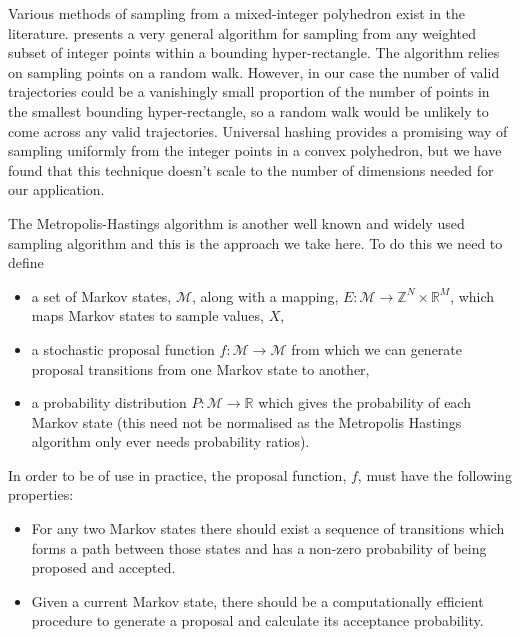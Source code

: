 \documentclass{article}
\begin{document}
Various methods of sampling from a mixed-integer polyhedron exist in the literature. \citet{baumert2009discrete} presents a very general algorithm for sampling from any weighted subset of integer points within a bounding hyper-rectangle. The algorithm relies on sampling points on a random walk. However, in our case the number of valid trajectories could be a vanishingly small proportion of the number of points in the smallest bounding hyper-rectangle, so a random walk would be unlikely to come across any valid trajectories. Universal hashing \citep{meel2016constrained} provides a promising way of sampling uniformly from the integer points in a convex polyhedron, but we have found that this technique doesn't scale to the number of dimensions needed for our application.

The Metropolis-Hastings algorithm is another well known and widely used sampling algorithm and this is the approach we take here. To do this we need to define
\begin{itemize}
\item a set of Markov states, $\mathcal{M}$, along with a mapping, $E:\mathcal{M} \to \mathbb{Z}^N \times \mathbb{R}^M$, which maps Markov states to sample values, $X$,

\item a stochastic proposal function $f:\mathcal{M} \to \mathcal{M}$ from which we can generate proposal transitions from one Markov state to another,

\item a probability distribution $P: \mathcal{M} \to \mathbb{R}$ which gives the probability of each Markov state (this need not be normalised as the Metropolis Hastings algorithm only ever needs probability ratios).

\end{itemize}

In order to be of use in practice, the proposal function, $f$, must have the following properties:
\begin{itemize}
	\item For any two Markov states there should exist a sequence of transitions which forms a path between those states and has a non-zero probability of being proposed and accepted.
	
	\item Given a current Markov state, there should be a computationally efficient procedure to generate a proposal and calculate its acceptance probability. 
\end{itemize}
\end{document}
